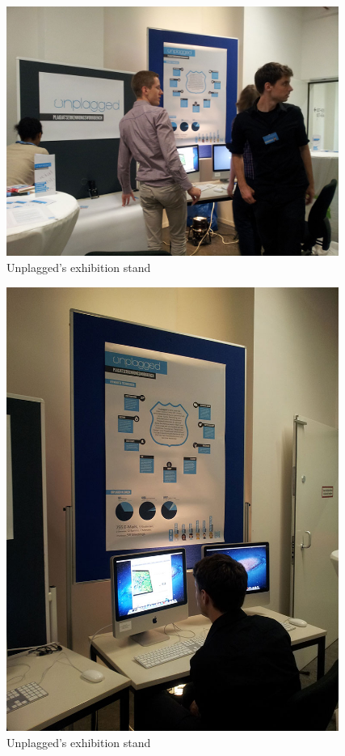 \begin{appendix}
\begin{figure}[!h]
  \centering
    \includegraphics[width=0.97\textwidth]{images/unplagged_exhibition_stand2.jpg}
  \caption{Unplagged's exhibition stand}
  \label{fig:unplagged_exhibition_stand2}
\end{figure}

\begin{figure}[!h]
  \centering
    \includegraphics[width=0.97\textwidth]{images/unplagged_exhibition_stand3.jpg}
  \caption{Unplagged's exhibition stand}
  \label{fig:unplagged_exhibition_stand3}
\end{figure}


\end{appendix}
